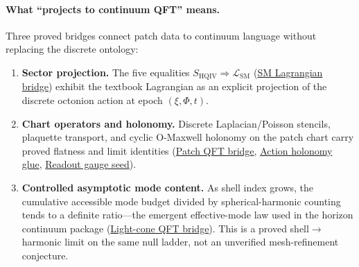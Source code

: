 \documentclass[11pt]{amsart}
\begin{document}
\paragraph{What ``projects to continuum QFT'' means.}
Three proved bridges connect patch data to continuum language without replacing the discrete ontology:
\begin{enumerate}[label=(\roman*),nosep]
\item \textbf{Sector projection.} The five equalities $S_{\mathrm{HQIV}}\Rightarrow\mathcal{L}_{\mathrm{SM}}$ (\hyperref[lean:sm-lagrangian-bridge]{SM Lagrangian bridge}) exhibit the textbook Lagrangian as an explicit projection of the discrete octonion action at epoch $(\xi,\Phi,t)$.
\item \textbf{Chart operators and holonomy.} Discrete Laplacian/Poisson stencils, plaquette transport, and cyclic O-Maxwell holonomy on the patch chart carry proved flatness and limit identities (\hyperref[lean:patch-qft-bridge]{Patch QFT bridge}, \hyperref[lean:action-holonomy-glue]{Action holonomy glue}, \hyperref[lean:readout-gauge-seed]{Readout gauge seed}).
\item \textbf{Controlled asymptotic mode content.} As shell index grows, the cumulative accessible mode budget divided by spherical-harmonic counting tends to a definite ratio---the emergent effective-mode law used in the horizon continuum package (\hyperref[lean:lightcone-qft-bridge]{Light-cone QFT bridge}). This is a proved shell$\to$harmonic limit on the same null ladder, not an unverified mesh-refinement conjecture.
\end{enumerate}
\end{document}
